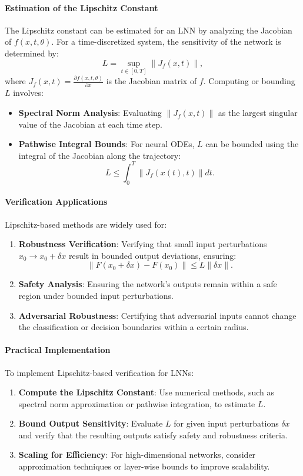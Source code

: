 \paragraph{Estimation of the Lipschitz Constant}
The Lipschitz constant can be estimated for an LNN by analyzing the Jacobian of \(f(x, t, \theta)\). For a time-discretized system, the sensitivity of the network is determined by:
\[
L = \sup_{t \in [0, T]} \| J_f(x, t) \|,
\]
where \(J_f(x, t) = \frac{\partial f(x, t, \theta)}{\partial x}\) is the Jacobian matrix of \(f\). Computing or bounding \(L\) involves:
\begin{itemize}
    \item \textbf{Spectral Norm Analysis}: Evaluating \(\|J_f(x, t)\|\) as the largest singular value of the Jacobian at each time step.
    \item \textbf{Pathwise Integral Bounds}: For neural ODEs, \(L\) can be bounded using the integral of the Jacobian along the trajectory:
    \[
    L \leq \int_0^T \|J_f(x(t), t)\| dt.
    \]
\end{itemize}

\paragraph{Verification Applications}
Lipschitz-based methods are widely used for:
\begin{enumerate}
    \item \textbf{Robustness Verification}: Verifying that small input perturbations \(x_0 \to x_0 + \delta x\) result in bounded output deviations, ensuring:
    \[
    \|F(x_0 + \delta x) - F(x_0)\| \leq L \|\delta x\|.
    \]
    \item \textbf{Safety Analysis}: Ensuring the network’s outputs remain within a safe region under bounded input perturbations.
    \item \textbf{Adversarial Robustness}: Certifying that adversarial inputs cannot change the classification or decision boundaries within a certain radius.
\end{enumerate}

\paragraph{Practical Implementation}
To implement Lipschitz-based verification for LNNs:
\begin{enumerate}
    \item \textbf{Compute the Lipschitz Constant}: Use numerical methods, such as spectral norm approximation or pathwise integration, to estimate \(L\).
    \item \textbf{Bound Output Sensitivity}: Evaluate \(L\) for given input perturbations \(\delta x\) and verify that the resulting outputs satisfy safety and robustness criteria.
    \item \textbf{Scaling for Efficiency}: For high-dimensional networks, consider approximation techniques or layer-wise bounds to improve scalability.
\end{enumerate}

